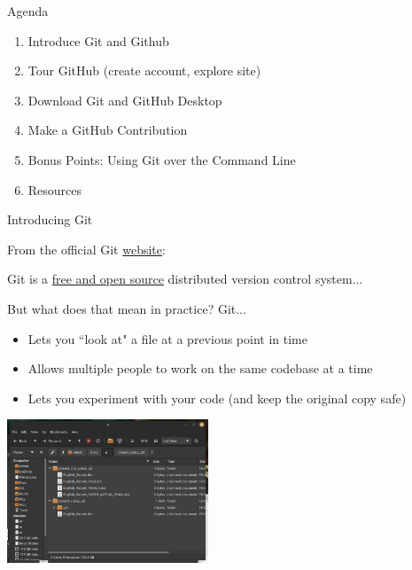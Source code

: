 \documentclass{beamer}
\begin{document}
\begin{frame}{Agenda}
	\begin{enumerate}
		\item Introduce Git and Github
		\item Tour GitHub (create account, explore site)
		\item Download Git and GitHub Desktop
		\item Make a GitHub Contribution
		\item Bonus Points: Using Git over the Command Line
		\item Resources
	\end{enumerate}

\end{frame}


\begin{frame}{Introducing Git}

	From the official Git \href{https://git-scm.com}{website}: \newline

	\begin{displayquote}
		Git is a \href{https://git-scm.com/about/free-and-open-source}{free and open source} distributed version control system...
	\end{displayquote}

	{
		\small

		But what does that mean in practice? Git...

		\begin{itemize}
			\item Lets you ``look at" a file at a previous point in time
			\item Allows multiple people to work on the same codebase at a time
			\item Lets you experiment with your code (and keep the original copy safe)
		\end{itemize}
	}
	
	\href{https://raw.githubusercontent.com/ecc-cs-club/slides/main/1-Git-And-GitHub/assets/using-git.png}{
		\includegraphics[width=6cm]{using-git.png}
	}
	

\end{frame}
\end{document}
